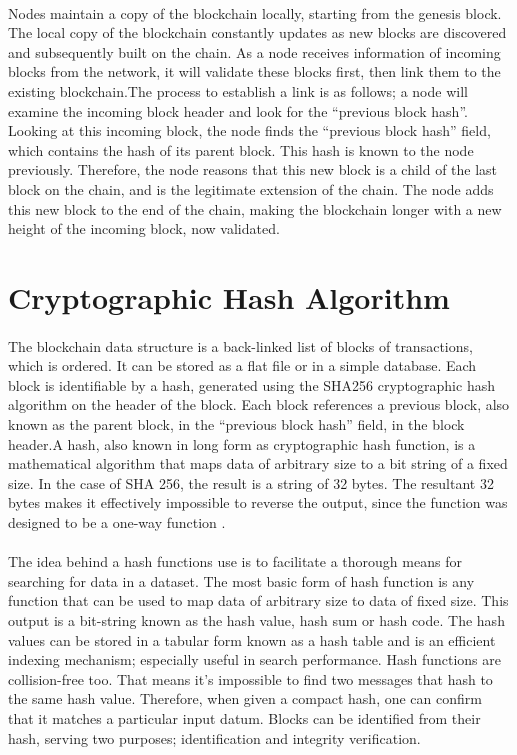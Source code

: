 \paragraph{}Nodes maintain a copy of the blockchain locally, starting from the genesis block. The local copy of the blockchain constantly updates as new blocks are discovered and subsequently built on the chain. As a node receives information of incoming blocks from the network, it will validate these blocks first, then link them to the existing blockchain.The process to establish a link is as follows; a node will examine the incoming block header and look for the “previous block hash”. Looking at this incoming block, the node finds the “previous block hash” field, which contains the hash of its parent block. This hash is known to the node previously. Therefore, the node reasons that this new block is a child of the last block on the chain, and is the legitimate extension of the chain. The node adds this new block to the end of the chain, making the blockchain longer with a new height of the incoming block, now validated.

\section{Cryptographic Hash Algorithm}

\paragraph{}The blockchain data structure is a back-linked list of blocks of transactions, which is ordered. It can be stored as a flat file or in a simple database. Each block is identifiable by a hash, generated using the SHA256 cryptographic hash algorithm on the header of the block. Each block references a previous block, also known as the parent block, in the “previous block hash” field, in the block header.A hash, also known in long form as cryptographic hash function, is a mathematical algorithm that maps data of arbitrary size to a bit string of a fixed size. In the case of SHA 256, the result is a string of 32 bytes. The resultant 32 bytes makes it effectively impossible to reverse the output, since the function was designed to be a one-way function .

\paragraph{}The idea behind a hash functions use is to facilitate a thorough means for searching for data in a dataset. The most basic form of hash function is any function that can be used to map data of arbitrary size to data of fixed size. This output is a bit-string known as the hash value, hash sum or hash code. The hash values can be stored in a tabular form known as a hash table and is an efficient indexing mechanism; especially useful in search performance. Hash functions are collision-free too. That means it’s impossible to find two messages that hash to the same hash value. Therefore, when given a compact hash, one can confirm that it matches a particular input datum. Blocks can be identified from their hash, serving two purposes; identification and integrity verification.
 
